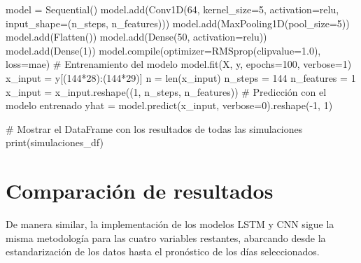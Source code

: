 \documentclass[
  us-letterpaper,
]{scrreprt}
\newenvironment{Shaded}{\begin{snugshade}}{\end{snugshade}}
\newcommand{\BuiltInTok}[1]{\textcolor[rgb]{0.00,0.23,0.31}{#1}}
\newcommand{\CommentTok}[1]{\textcolor[rgb]{0.37,0.37,0.37}{#1}}
\newcommand{\DecValTok}[1]{\textcolor[rgb]{0.68,0.00,0.00}{#1}}
\newcommand{\FloatTok}[1]{\textcolor[rgb]{0.68,0.00,0.00}{#1}}
\newcommand{\NormalTok}[1]{\textcolor[rgb]{0.00,0.23,0.31}{#1}}
\newcommand{\OperatorTok}[1]{\textcolor[rgb]{0.37,0.37,0.37}{#1}}
\newcommand{\StringTok}[1]{\textcolor[rgb]{0.13,0.47,0.30}{#1}}
\theoremstyle{plain}
\theoremstyle{definition}
\theoremstyle{definition}
\theoremstyle{remark}
\begin{document}
\begin{Shaded}
\begin{Highlighting}[]
\NormalTok{    model }\OperatorTok{=}\NormalTok{ Sequential()}
\NormalTok{    model.add(Conv1D(}\DecValTok{64}\NormalTok{, kernel\_size}\OperatorTok{=}\DecValTok{5}\NormalTok{, activation}\OperatorTok{=}\StringTok{\textquotesingle{}relu\textquotesingle{}}\NormalTok{, }
\NormalTok{    input\_shape}\OperatorTok{=}\NormalTok{(n\_steps, n\_features)))}
\NormalTok{    model.add(MaxPooling1D(pool\_size}\OperatorTok{=}\DecValTok{5}\NormalTok{))}
\NormalTok{    model.add(Flatten())}
\NormalTok{    model.add(Dense(}\DecValTok{50}\NormalTok{, activation}\OperatorTok{=}\StringTok{\textquotesingle{}relu\textquotesingle{}}\NormalTok{))}
\NormalTok{    model.add(Dense(}\DecValTok{1}\NormalTok{))}
\NormalTok{    model.}\BuiltInTok{compile}\NormalTok{(optimizer}\OperatorTok{=}\NormalTok{RMSprop(clipvalue}\OperatorTok{=}\FloatTok{1.0}\NormalTok{), loss}\OperatorTok{=}\StringTok{\textquotesingle{}mae\textquotesingle{}}\NormalTok{)}
    \CommentTok{\# Entrenamiento del modelo}
\NormalTok{    model.fit(X, y, epochs}\OperatorTok{=}\DecValTok{100}\NormalTok{, verbose}\OperatorTok{=}\DecValTok{1}\NormalTok{)}
\NormalTok{    x\_input }\OperatorTok{=}\NormalTok{ y[(}\DecValTok{144}\OperatorTok{*}\DecValTok{28}\NormalTok{):(}\DecValTok{144}\OperatorTok{*}\DecValTok{29}\NormalTok{)]}
\NormalTok{    n }\OperatorTok{=} \BuiltInTok{len}\NormalTok{(x\_input)}
\NormalTok{    n\_steps }\OperatorTok{=} \DecValTok{144}
\NormalTok{    n\_features }\OperatorTok{=} \DecValTok{1}
\NormalTok{    x\_input }\OperatorTok{=}\NormalTok{  x\_input.reshape((}\DecValTok{1}\NormalTok{, n\_steps, n\_features))}
    \CommentTok{\# Predicción con el modelo entrenado}
\NormalTok{    yhat }\OperatorTok{=}\NormalTok{ model.predict(x\_input, verbose}\OperatorTok{=}\DecValTok{0}\NormalTok{).reshape(}\OperatorTok{{-}}\DecValTok{1}\NormalTok{, }\DecValTok{1}\NormalTok{)}

\CommentTok{\# Mostrar el DataFrame con los resultados de todas las simulaciones}
\BuiltInTok{print}\NormalTok{(simulaciones\_df)}
\end{Highlighting}
\end{Shaded}

\section{Comparación de resultados}\label{comparaciuxf3n-de-resultados}

De manera similar, la implementación de los modelos LSTM y CNN sigue la
misma metodología para las cuatro variables restantes, abarcando desde
la estandarización de los datos hasta el pronóstico de los días
seleccionados.
\end{document}

